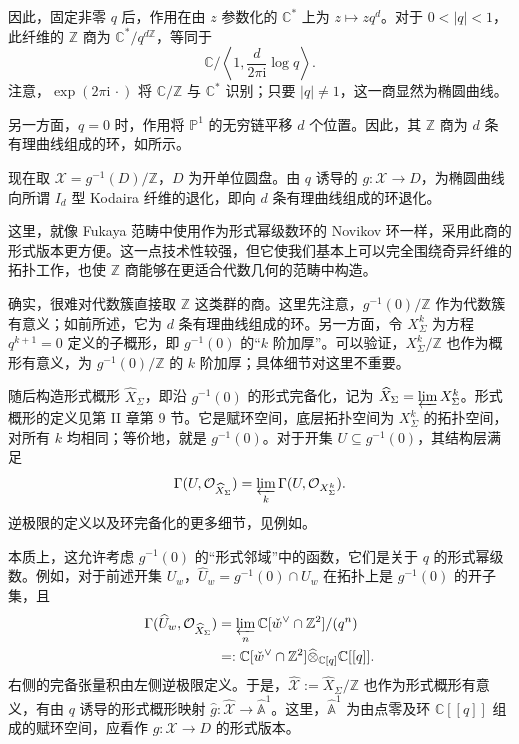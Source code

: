 因此，固定非零 $q$ 后，作用在由 $z$ 参数化的 $\mathbb C^*$ 上为 $z\mapsto zq^d$。对于 $0<|q|<1$，此纤维的 $\mathbb Z$ 商为 $\mathbb C^*/q^{d\mathbb Z}$，等同于
\[
\mathbb C/\left\langle1,\frac d{2\pi\mathrm i}\log q\right\rangle.
\]
注意，$\exp(2\pi\mathrm i\,\cdot)$ 将 $\mathbb C/\mathbb Z$ 与 $\mathbb C^*$ 识别；只要 $|q|\neq1$，这一商显然为椭圆曲线。

另一方面，$q=0$ 时，作用将 $\mathbb P^1$ 的无穷链平移 $d$ 个位置。因此，其 $\mathbb Z$ 商为 $d$ 条有理曲线组成的环，如所示。
\begin{figure}[H]
\centering
{}
\BookNumberOnlyCaption\label{fig:8.27}
\end{figure}

现在取 $\mathcal X=g^{-1}(D)/\mathbb Z$，$D$ 为开单位圆盘。由 $q$ 诱导的 $g\colon\mathcal X\to D$，为椭圆曲线向所谓 $I_d$ 型 Kodaira 纤维的退化，即向 $d$ 条有理曲线组成的环退化。

这里，就像 Fukaya 范畴中使用作为形式幂级数环的 Novikov 环一样，采用此商的形式版本更方便。这一点技术性较强，但它使我们基本上可以完全围绕奇异纤维的拓扑工作，也使 $\mathbb Z$ 商能够在更适合代数几何的范畴中构造。

确实，很难对代数簇直接取 $\mathbb Z$ 这类群的商。这里先注意，$g^{-1}(0)/\mathbb Z$ 作为代数簇有意义；如前所述，它为 $d$ 条有理曲线组成的环。另一方面，令 $X_\Sigma^k$ 为方程 $q^{k+1}=0$ 定义的子概形，即 $g^{-1}(0)$ 的“$k$ 阶加厚”。可以验证，$X_\Sigma^k/\mathbb Z$ 也作为概形有意义，为 $g^{-1}(0)/\mathbb Z$ 的 $k$ 阶加厚；具体细节对这里不重要。

随后构造形式概形 $\widehat X_\Sigma$，即沿 $g^{-1}(0)$ 的形式完备化，记为 $\widehat X_\Sigma=\varprojlim X_\Sigma^k$。形式概形的定义见第 II 章第 9 节。它是赋环空间，底层拓扑空间为 $X_\Sigma^k$ 的拓扑空间，对所有 $k$ 均相同；等价地，就是 $g^{-1}(0)$。对于开集 $U\subseteq g^{-1}(0)$，其结构层满足
\[
\Gamma(U,\mathcal O_{\widehat X_\Sigma})
=\varprojlim_k\Gamma(U,\mathcal O_{X_\Sigma^k}).
\]
逆极限的定义以及环完备化的更多细节，见例如。

本质上，这允许考虑 $g^{-1}(0)$ 的“形式邻域”中的函数，它们是关于 $q$ 的形式幂级数。例如，对于前述开集 $U_w$，$\widehat U_w=g^{-1}(0)\cap U_w$ 在拓扑上是 $g^{-1}(0)$ 的开子集，且
\[
\begin{aligned}
\Gamma(\widehat U_w,\mathcal O_{\widehat X_\Sigma})
&=\varprojlim_n\mathbb C[\check w^\vee\cap\mathbb Z^2]/(q^n)\\
&=: \mathbb C[\check w^\vee\cap\mathbb Z^2]
\widehat\otimes_{\mathbb C[q]}\mathbb C[[q]].
\end{aligned}
\]
右侧的完备张量积由左侧逆极限定义。于是，$\widehat{\mathcal X}:=\widehat X_\Sigma/\mathbb Z$ 也作为形式概形有意义，有由 $q$ 诱导的形式概形映射 $\widehat g\colon\widehat{\mathcal X}\to\widehat{\mathbb A}^1$。这里，$\widehat{\mathbb A}^1$ 为由点零及环 $\mathbb C[[q]]$ 组成的赋环空间，应看作 $g\colon\mathcal X\to D$ 的形式版本。

